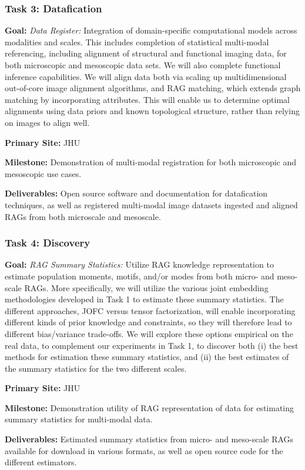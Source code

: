 \subsubsection{Task 3: Datafication}
\begin{compactitem}
\item \textbf{Goal:} \emph{Data Register:} Integration of domain-specific computational models across modalities and scales. This includes completion of statistical multi-modal referencing, including alignment of structural and functional imaging data, for both microscopic and mesoscopic data sets.  We will also complete functional inference capabilities. We will align data both via scaling up multidimensional out-of-core image alignment algorithms, and RAG matching, which extends graph matching by incorporating attributes.  This will enable us to determine optimal alignments using data priors and known topological structure, rather than relying on images to align well.
\item \textbf{Primary Site:} JHU
\item \textbf{Milestone:} Demonstration of multi-modal registration for both microscopic and mesoscopic use cases.
\item \textbf{Deliverables:} Open source software and documentation for datafication techniques, as well as registered multi-modal image datasets ingested and aligned RAGs from both microscale and mesoscale.
\end{compactitem}


\subsubsection{Task 4: Discovery}
\begin{compactitem}
\item \textbf{Goal:} \emph{RAG Summary Statistics:} Utilize RAG knowledge representation to estimate population moments, motifs, and/or modes from both  micro- and meso-scale RAGs.  More specifically, we will utilize the various joint embedding methodologies developed in Task 1 to estimate these summary statistics.  The different approaches, JOFC versus tensor factorization, will enable incorporating different kinds of prior knowledge and constraints, so they will therefore lead to different bias/variance trade-offs.  We will explore these options empirical on the real data, to complement our experiments in Task 1, to discover both (i) the best methods for estimation these summary statistics, and (ii) the best estimates of the summary statistics for the two different scales.
\item \textbf{Primary Site:} JHU
\item \textbf{Milestone:} Demonstration utility of RAG representation of data for estimating summary statistics for multi-modal data.
\item \textbf{Deliverables:} Estimated summary statistics from micro- and meso-scale RAGs available for download in various formats, as well as open source code for the different estimators. 
\end{compactitem}




